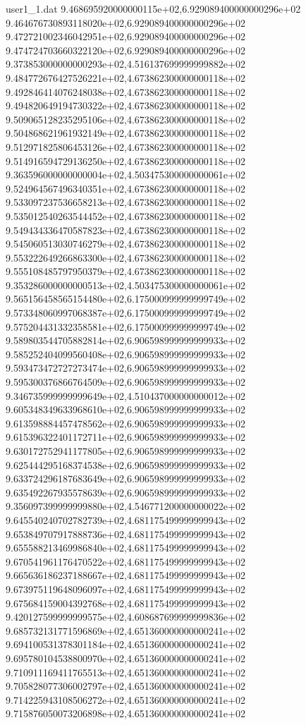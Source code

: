 \begin{filecontents}{user1_1.dat}
9.468695920000000115e+02,6.929089400000000296e+02
9.464676730893118020e+02,6.929089400000000296e+02
9.472721002346042951e+02,6.929089400000000296e+02
9.474724703660322120e+02,6.929089400000000296e+02
9.373853000000000293e+02,4.516137699999999882e+02
9.484772676427526221e+02,4.673862300000000118e+02
9.492846414076248038e+02,4.673862300000000118e+02
9.494820649194730322e+02,4.673862300000000118e+02
9.509065128235295106e+02,4.673862300000000118e+02
9.504868621961932149e+02,4.673862300000000118e+02
9.512971825806453126e+02,4.673862300000000118e+02
9.514916594729136250e+02,4.673862300000000118e+02
9.363596000000000004e+02,4.503475300000000061e+02
9.524964567496340351e+02,4.673862300000000118e+02
9.533097237536658213e+02,4.673862300000000118e+02
9.535012540263544452e+02,4.673862300000000118e+02
9.549434336470587823e+02,4.673862300000000118e+02
9.545060513030746279e+02,4.673862300000000118e+02
9.553222649266863300e+02,4.673862300000000118e+02
9.555108485797950379e+02,4.673862300000000118e+02
9.353286000000000513e+02,4.503475300000000061e+02
9.565156458565154480e+02,6.175000999999999749e+02
9.573348060997068387e+02,6.175000999999999749e+02
9.575204431332358581e+02,6.175000999999999749e+02
9.589803544705882814e+02,6.906598999999999933e+02
9.585252404099560408e+02,6.906598999999999933e+02
9.593473472727273474e+02,6.906598999999999933e+02
9.595300376866764509e+02,6.906598999999999933e+02
9.346735999999999649e+02,4.510437000000000012e+02
9.605348349633968610e+02,6.906598999999999933e+02
9.613598884457478562e+02,6.906598999999999933e+02
9.615396322401172711e+02,6.906598999999999933e+02
9.630172752941177805e+02,6.906598999999999933e+02
9.625444295168374538e+02,6.906598999999999933e+02
9.633724296187683649e+02,6.906598999999999933e+02
9.635492267935578639e+02,6.906598999999999933e+02
9.356097399999999880e+02,4.546771200000000022e+02
9.645540240702782739e+02,4.681175499999999943e+02
9.653849707917888736e+02,4.681175499999999943e+02
9.655588213469986840e+02,4.681175499999999943e+02
9.670541961176470522e+02,4.681175499999999943e+02
9.665636186237188667e+02,4.681175499999999943e+02
9.673975119648096097e+02,4.681175499999999943e+02
9.675684159004392768e+02,4.681175499999999943e+02
9.420127599999999575e+02,4.608687699999999836e+02
9.685732131771596869e+02,4.651360000000000241e+02
9.694100531378301184e+02,4.651360000000000241e+02
9.695780104538800970e+02,4.651360000000000241e+02
9.710911169411765513e+02,4.651360000000000241e+02
9.705828077306002797e+02,4.651360000000000241e+02
9.714225943108506272e+02,4.651360000000000241e+02
9.715876050073206898e+02,4.651360000000000241e+02

\end{filecontents}
